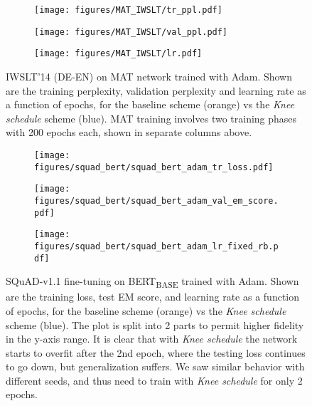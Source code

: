 \documentclass{article} \usepackage{iclr2021_conference,times}
\newcommand{\lrschedule}{\textit{Knee schedule}}
\begin{document}
\begin{figure}[h]
    \begin{subfigure}[t]{\textwidth}
        \centering
        \texttt{[image: figures/MAT\_IWSLT/tr\_ppl.pdf]}
        \label{fig:MAT_adam_tr_ppl}
    \end{subfigure}
    \begin{subfigure}[t]{\textwidth}
        \centering
        \texttt{[image: figures/MAT\_IWSLT/val\_ppl.pdf]}
        \label{fig:MAT_adam_val_ppl}
    \end{subfigure}
    \begin{subfigure}[t]{\textwidth}
        \centering
        \texttt{[image: figures/MAT\_IWSLT/lr.pdf]}
        \label{fig:MAT_adam_lr}
    \end{subfigure}
\caption{IWSLT'14 (DE-EN) on MAT network trained with Adam. Shown are the training perplexity, validation perplexity and learning rate as a function of epochs, for the baseline scheme (orange) vs the \lrschedule{} scheme (blue). MAT training involves two training phases with 200 epochs each, shown in separate columns above.}
\label{fig:MAT_adam_result}
\end{figure}


\begin{figure}[h]
    \begin{subfigure}[t]{\textwidth}
        \centering
        \texttt{[image: figures/squad\_bert/squad\_bert\_adam\_tr\_loss.pdf]}
        \label{fig:squad_bert_adam_tr_loss}
    \end{subfigure}
    \begin{subfigure}[t]{\textwidth}
        \centering
        \texttt{[image: figures/squad\_bert/squad\_bert\_adam\_val\_em\_score.pdf]}
        \label{fig:squad_bert_adam_test_acc}
    \end{subfigure}
    \begin{subfigure}[t]{\textwidth}
        \centering
        \texttt{[image: figures/squad\_bert/squad\_bert\_adam\_lr\_fixed\_rb.pdf]}
        \label{fig:squad_bert_adam_lr}
    \end{subfigure}
\caption{SQuAD-v1.1 fine-tuning on BERT\textsubscript{BASE} trained with Adam. Shown are the training loss, test EM score, and learning rate as a function of epochs, for the baseline scheme (orange) vs the \lrschedule{} scheme (blue). The plot is split into 2 parts to permit higher fidelity in the y-axis range. It is clear that with \lrschedule{} the network starts to overfit after the 2nd epoch, where the testing loss continues to go down, but generalization suffers. We saw similar behavior with different seeds, and thus need to train with \lrschedule{} for only 2 epochs.}

\label{fig:squad_bert_adam_result}
\end{figure}
 \clearpage
\clearpage
\end{document}
